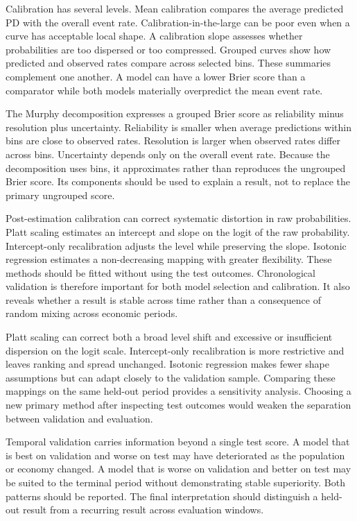 Calibration has several levels. Mean calibration compares the average predicted PD with the overall event rate. Calibration-in-the-large can be poor even when a curve has acceptable local shape. A calibration slope assesses whether probabilities are too dispersed or too compressed. Grouped curves show how predicted and observed rates compare across selected bins. These summaries complement one another. A model can have a lower Brier score than a comparator while both models materially overpredict the mean event rate.

The Murphy decomposition expresses a grouped Brier score as reliability minus resolution plus uncertainty. Reliability is smaller when average predictions within bins are close to observed rates. Resolution is larger when observed rates differ across bins. Uncertainty depends only on the overall event rate. Because the decomposition uses bins, it approximates rather than reproduces the ungrouped Brier score. Its components should be used to explain a result, not to replace the primary ungrouped score.

Post-estimation calibration can correct systematic distortion in raw probabilities. Platt scaling estimates an intercept and slope on the logit of the raw probability. Intercept-only recalibration adjusts the level while preserving the slope. Isotonic regression estimates a non-decreasing mapping with greater flexibility. These methods should be fitted without using the test outcomes. Chronological validation is therefore important for both model selection and calibration. It also reveals whether a result is stable across time rather than a consequence of random mixing across economic periods.

Platt scaling can correct both a broad level shift and excessive or insufficient dispersion on the logit scale. Intercept-only recalibration is more restrictive and leaves ranking and spread unchanged. Isotonic regression makes fewer shape assumptions but can adapt closely to the validation sample. Comparing these mappings on the same held-out period provides a sensitivity analysis. Choosing a new primary method after inspecting test outcomes would weaken the separation between validation and evaluation.

Temporal validation carries information beyond a single test score. A model that is best on validation and worse on test may have deteriorated as the population or economy changed. A model that is worse on validation and better on test may be suited to the terminal period without demonstrating stable superiority. Both patterns should be reported. The final interpretation should distinguish a held-out result from a recurring result across evaluation windows.

